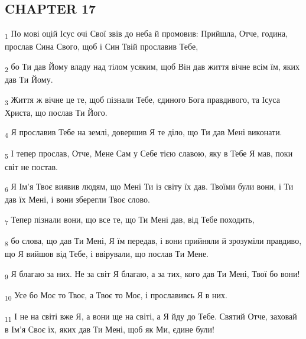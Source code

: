 \subsection{CHAPTER 17}
\begin{tcolorbox}
\textsubscript{1} По мові оцій Ісус очі Свої звів до неба й промовив: Прийшла, Отче, година, прослав Сина Свого, щоб і Син Твій прославив Тебе,
\end{tcolorbox}
\begin{tcolorbox}
\textsubscript{2} бо Ти дав Йому владу над тілом усяким, щоб Він дав життя вічне всім їм, яких дав Ти Йому.
\end{tcolorbox}
\begin{tcolorbox}
\textsubscript{3} Життя ж вічне це те, щоб пізнали Тебе, єдиного Бога правдивого, та Ісуса Христа, що послав Ти Його.
\end{tcolorbox}
\begin{tcolorbox}
\textsubscript{4} Я прославив Тебе на землі, довершив Я те діло, що Ти дав Мені виконати.
\end{tcolorbox}
\begin{tcolorbox}
\textsubscript{5} І тепер прослав, Отче, Мене Сам у Себе тією славою, яку в Тебе Я мав, поки світ не постав.
\end{tcolorbox}
\begin{tcolorbox}
\textsubscript{6} Я Ім'я Твоє виявив людям, що Мені Ти із світу їх дав. Твоїми були вони, і Ти дав їх Мені, і вони зберегли Твоє слово.
\end{tcolorbox}
\begin{tcolorbox}
\textsubscript{7} Тепер пізнали вони, що все те, що Ти Мені дав, від Тебе походить,
\end{tcolorbox}
\begin{tcolorbox}
\textsubscript{8} бо слова, що дав Ти Мені, Я їм передав, і вони прийняли й зрозуміли правдиво, що Я вийшов від Тебе, і ввірували, що послав Ти Мене.
\end{tcolorbox}
\begin{tcolorbox}
\textsubscript{9} Я благаю за них. Не за світ Я благаю, а за тих, кого дав Ти Мені, Твої бо вони!
\end{tcolorbox}
\begin{tcolorbox}
\textsubscript{10} Усе бо Моє то Твоє, а Твоє то Моє, і прославивсь Я в них.
\end{tcolorbox}
\begin{tcolorbox}
\textsubscript{11} І не на світі вже Я, а вони ще на світі, а Я йду до Тебе. Святий Отче, заховай в Ім'я Своє їх, яких дав Ти Мені, щоб як Ми, єдине були!
\end{tcolorbox}

